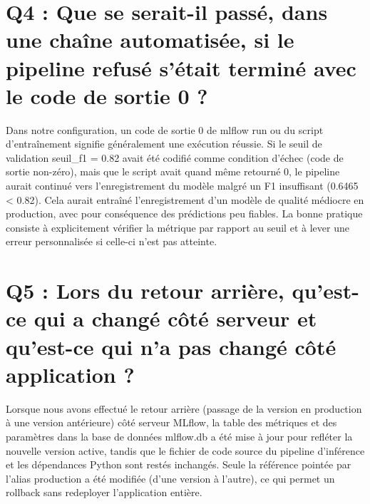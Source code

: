 \documentclass[12pt,a4paper]{report}
\begin{document}
\section{Q4 : Que se serait-il passé, dans une chaîne automatisée, si le pipeline refusé s'était terminé avec le code de sortie 0 ?}
Dans notre configuration, un code de sortie 0 de mlflow run ou du script d'entraînement signifie généralement une exécution réussie. Si le seuil de validation seuil\_f1 = 0.82 avait été codifié comme condition d'échec (code de sortie non-zéro), mais que le script avait quand même retourné 0, le pipeline aurait continué vers l'enregistrement du modèle malgré un F1 insuffisant (0.6465 < 0.82). Cela aurait entraîné l'enregistrement d'un modèle de qualité médiocre en production, avec pour conséquence des prédictions peu fiables. La bonne pratique consiste à explicitement vérifier la métrique par rapport au seuil et à lever une erreur personnalisée si celle-ci n'est pas atteinte.

\section{Q5 : Lors du retour arrière, qu'est-ce qui a changé côté serveur et qu'est-ce qui n'a pas changé côté application ?}
Lorsque nous avons effectué le retour arrière (passage de la version en production à une version antérieure) côté serveur MLflow, la table des métriques et des paramètres dans la base de données mlflow.db a été mise à jour pour refléter la nouvelle version active, tandis que le fichier de code source du pipeline d'inférence et les dépendances Python sont restés inchangés. Seule la référence pointée par l'alias production a été modifiée (d'une version à l'autre), ce qui permet un rollback sans redeployer l'application entière.
\end{document}
